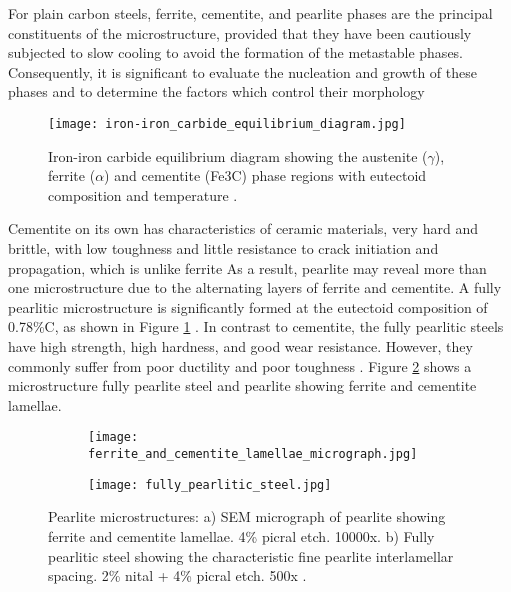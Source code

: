 For plain carbon steels, ferrite, cementite, and pearlite phases are the principal constituents of the microstructure, provided that they have been cautiously subjected to slow cooling to avoid the formation of the metastable phases. Consequently, it is significant to evaluate the nucleation and growth of these phases and to determine the factors which control their morphology \cite{bhadeshia2017steels}

\begin{figure}[H]
    \centering
    \texttt{[image: iron-iron\_carbide\_equilibrium\_diagram.jpg]}
    \caption{Iron-iron carbide equilibrium diagram showing the austenite ($\gamma$), ferrite ($\alpha$) and cementite (Fe3C) phase regions with eutectoid composition and temperature \cite{cmrp2014maintenance}.}
    \label{ch3:figure:equilibrium}
\end{figure}

Cementite on its own has characteristics of ceramic materials, very hard and brittle, with low toughness and little resistance to crack initiation and propagation, which is unlike ferrite \cite{bajaj2020steels} As a result, pearlite may reveal more than one microstructure due to the alternating layers of ferrite and cementite. A fully pearlitic microstructure is significantly formed at the eutectoid composition of 0.78\%C, as shown in Figure \ref{ch3:figure:equilibrium} \cite{molabe2018determining}. In contrast to cementite, the fully pearlitic steels have high strength, high hardness, and good wear resistance. However, they commonly suffer from poor ductility and poor toughness \cite{molabe2018determining}. Figure \ref{ch3:figure:pearlite:microstructures} shows a microstructure fully pearlite steel and pearlite showing ferrite and cementite lamellae.

\begin{figure}[H]

\centering
\begin{subfigure}{.45\textwidth}
    \centering
    \texttt{[image: ferrite\_and\_cementite\_lamellae\_micrograph.jpg]}
    \caption{}
\end{subfigure}
\begin{subfigure}{.45\textwidth}
    \centering
    \texttt{[image: fully\_pearlitic\_steel.jpg]}
    \caption{}
\end{subfigure}

\caption{Pearlite microstructures:  a) SEM micrograph of pearlite showing ferrite and cementite lamellae. 4\% picral etch. 10000x. b) Fully pearlitic steel showing the characteristic fine pearlite interlamellar spacing. 2\% nital + 4\% picral etch. 500x \cite{molabe2018determining}.}
\label{ch3:figure:pearlite:microstructures}
\end{figure}


